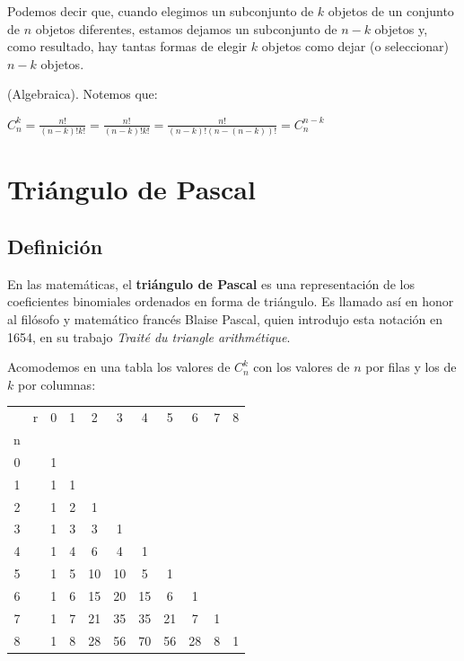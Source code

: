 \documentclass[12pt]{article}
\begin{document}
\begin{demostracion}
    Podemos decir que, cuando elegimos un subconjunto de $k$ objetos de un conjunto de $n$ objetos diferentes, estamos dejamos un subconjunto de $n-k$ objetos y, como resultado, hay tantas formas de elegir $k$ objetos como dejar (o seleccionar) $n-k$ objetos.
\end{demostracion}

\begin{demostracion}{(Algebraica).}
    Notemos que:
    \begin{center}
        $C^{k}_{n} = \frac{n!}{(n-k)!k!} = \frac{n!}{(n-k)!k!} = \frac{n!}{(n-k)!(n-(n-k))!} = C^{n-k}_{n}$
    \end{center}
\end{demostracion}
    

\section{Triángulo de Pascal}

\subsection{Definición}

\begin{definicion}
    En las matemáticas, el \textbf{triángulo de Pascal} es una representación de los coeficientes binomiales ordenados en forma de triángulo. Es llamado así en honor al filósofo y matemático francés Blaise Pascal, quien introdujo esta notación en 1654, en su trabajo \textit{Traité du triangle arithmétique}.
\end{definicion}

Acomodemos en una tabla los valores de $C^{k}_{n}$ con los valores de $n$ por filas y los de $k$ por columnas:

\begin{center}
    \begin{tabular}{|cc|ccccccccc|}
    \hline
      & r & 0 & 1 & 2  & 3  & 4  & 5  & 6  & 7 & 8 \\
    n &   &   &   &    &    &    &    &    &   &   \\ \hline
    0 &   & 1 &   &    &    &    &    &    &   &   \\
    1 &   & 1 & 1 &    &    &    &    &    &   &   \\
    2 &   & 1 & 2 & 1  &    &    &    &    &   &   \\
    3 &   & 1 & 3 & 3  & 1  &    &    &    &   &   \\
    4 &   & 1 & 4 & 6  & 4  & 1  &    &    &   &   \\
    5 &   & 1 & 5 & 10 & 10 & 5  & 1  &    &   &   \\
    6 &   & 1 & 6 & 15 & 20 & 15 & 6  & 1  &   &   \\
    7 &   & 1 & 7 & 21 & 35 & 35 & 21 & 7  & 1 &   \\
    8 &   & 1 & 8 & 28 & 56 & 70 & 56 & 28 & 8 & 1 \\ \hline
    \end{tabular}
\end{center}
\end{document}
